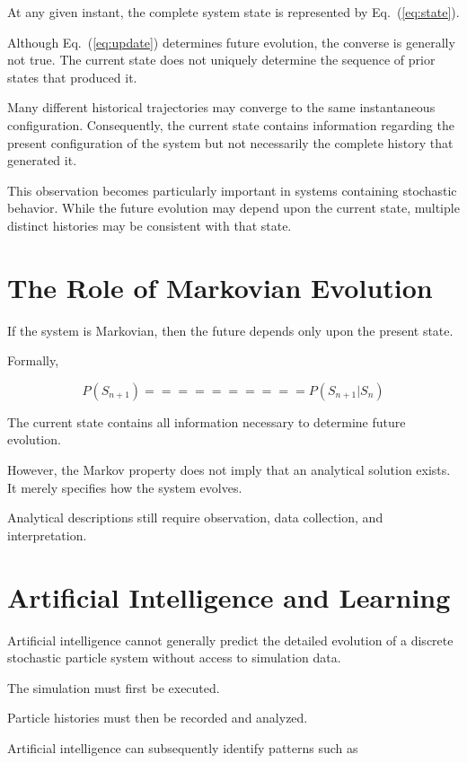 At any given instant, the complete system state is represented by Eq.~(\ref{eq:state}).

Although Eq.~(\ref{eq:update}) determines future evolution, the converse is generally not true. The current state does not uniquely determine the sequence of prior states that produced it.

Many different historical trajectories may converge to the same instantaneous configuration. Consequently, the current state contains information regarding the present configuration of the system but not necessarily the complete history that generated it.

This observation becomes particularly important in systems containing stochastic behavior. While the future evolution may depend upon the current state, multiple distinct histories may be consistent with that state.

\section{The Role of Markovian Evolution}

If the system is Markovian, then the future depends only upon the present state.

Formally,

\begin{equation}
P(S_{n+1})
==========
P(S_{n+1}|S_n)
\label{eq:markov}
\end{equation}

The current state contains all information necessary to determine future evolution.

However, the Markov property does not imply that an analytical solution exists. It merely specifies how the system evolves.

Analytical descriptions still require observation, data collection, and interpretation.

\section{Artificial Intelligence and Learning}

Artificial intelligence cannot generally predict the detailed evolution of a discrete stochastic particle system without access to simulation data.

The simulation must first be executed.

Particle histories must then be recorded and analyzed.

Artificial intelligence can subsequently identify patterns such as

